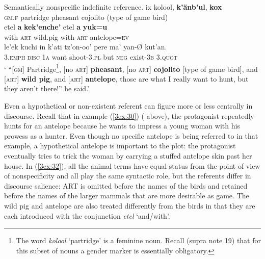 \documentclass[output=paper]{langsci/langscibook}
\begin{document}
\begin{exe}
\ex\label{3ex:32}
Semantically nonspecific indefinite reference. 
\exi{}
\gll	ix			kolool,	{\textbf{k'\"anb'ul}},	{\textbf{kox}} \\
	{\textsc{gm.f}}		partridge	pheasant		{cojolito (type of game bird)} \\
\glt
\exi{}
\gll	etel	{\textbf{a}}	{\textbf{kek'enche'}}	etel	{\textbf{a}}	{\textbf{yuk=u}} \\
	with	{\textsc{art}}	wild.pig			with	{\textsc{art}}	antelope={\textsc{ev}} \\
\glt
\exi{}
\gll	le'ek			kuchi			in		k'ati		tz'on-oo' 			pere		ma'		yan-{\O}		kut'an.\\
	{\textsc{3.emph}}	{\textsc{disc}}		{\textsc{1a}}	want		shoot-{\textsc{3.pl}} 	but		{\textsc{neg}}	exist-{\textsc{3b}}	{\textsc{3.quot}} \\
\glt	` ``[{\textsc{gm}}] Partridge\footnote{The word {\emph{kolool}} `partridge' is a feminine noun.  Recall (supra note 19) that for this subset of nouns a gender marker is essentially obligatory.}, [no {\textsc{art}}] {\textbf{pheasant}}, [no {\textsc{art}}] {\textbf{cojolito}} [type of game bird], and [{\textsc{art}}] {\textbf{wild pig}}, and [{\textsc{art}}] {\textbf{antelope}}, those are what I really want to hunt, but they aren't there!'' he said.'
\end{exe}

Even a hypothetical or non-existent referent can figure more or less centrally in discourse.  Recall that in example (\ref{3ex:30}) ( above), the protagonist repeatedly hunts for an antelope because he wants to impress a young woman with his prowess as a hunter.  Even though no specific antelope is being referred to in that example, a hypothetical antelope is important to the plot: the protagonist eventually tries to trick the woman by carrying a stuffed antelope skin past her house. In (\ref{3ex:32}), all the animal terms have equal status from the point of view of nonspecificity and all play the same syntactic role, but the referents differ in discourse salience: ART is omitted before the names of the birds and retained before the names of the larger mammals that are more desirable as game.  The wild pig and antelope are also treated differently from the birds in that they are each introduced with the conjunction {\emph{etel}} `and/with'.
\end{document}
